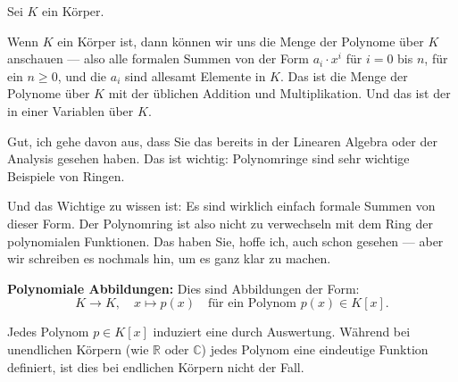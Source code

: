 \begin{math-stroke}
Sei $K$ ein Körper.
\end{math-stroke}

\begin{spoken-clean}[00:01:50 - 00:04:30]
Wenn $K$ ein Körper ist, dann können wir uns die Menge der Polynome über $K$ anschauen --- also alle formalen Summen von der Form $a_i \cdot x^i$ für $i = 0$ bis $n$, für ein $n \ge 0$, und die $a_i$ sind allesamt Elemente in $K$. Das ist die Menge der Polynome über $K$ mit der üblichen Addition und Multiplikation. Und das ist der  in einer Variablen über $K$.

Gut, ich gehe davon aus, dass Sie das bereits in der Linearen Algebra oder der Analysis gesehen haben. Das ist wichtig: Polynomringe sind sehr wichtige Beispiele von Ringen.

Und das Wichtige zu wissen ist: Es sind wirklich einfach formale Summen von dieser Form. Der Polynomring ist also nicht zu verwechseln mit dem Ring der polynomialen Funktionen. Das haben Sie, hoffe ich, auch schon gesehen --- aber wir schreiben es nochmals hin, um es ganz klar zu machen.
\end{spoken-clean}

\begin{math-stroke}

\textbf{Polynomiale Abbildungen:}
Dies sind Abbildungen der Form:
\[
K \to K, \quad x \mapsto p(x) \quad \text{für ein Polynom } p(x) \in K[x].
\]

\begin{explanation-of-steps}
Jedes Polynom $p \in K[x]$ induziert eine  durch Auswertung. Während bei unendlichen Körpern (wie $\mathbb{R}$ oder $\mathbb{C}$) jedes Polynom eine eindeutige Funktion definiert, ist dies bei endlichen Körpern nicht der Fall.
\end{explanation-of-steps}
\end{math-stroke}

